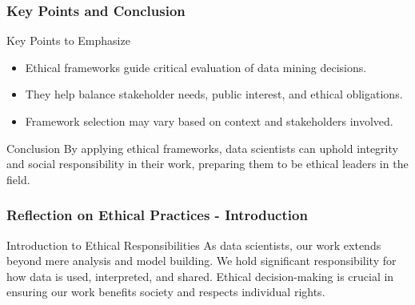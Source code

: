 \documentclass[aspectratio=169]{beamer}
\begin{document}
\begin{frame}[fragile]
    \frametitle{Key Points and Conclusion}
    
    \begin{block}{Key Points to Emphasize}
        \begin{itemize}
            \item Ethical frameworks guide critical evaluation of data mining decisions.
            \item They help balance stakeholder needs, public interest, and ethical obligations.
            \item Framework selection may vary based on context and stakeholders involved.
        \end{itemize}
    \end{block}

    \begin{block}{Conclusion}
        By applying ethical frameworks, data scientists can uphold integrity and social responsibility in their work, preparing them to be ethical leaders in the field.
    \end{block}
\end{frame}

\begin{frame}[fragile]
    \frametitle{Reflection on Ethical Practices - Introduction}
    \begin{block}{Introduction to Ethical Responsibilities}
        As data scientists, our work extends beyond mere analysis and model building. 
        We hold significant responsibility for how data is used, interpreted, and shared. 
        Ethical decision-making is crucial in ensuring our work benefits society and respects individual rights.
    \end{block}
\end{frame}
\end{document}
